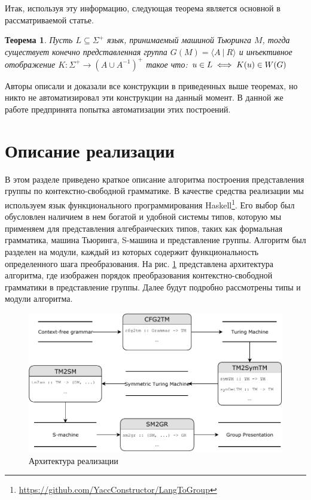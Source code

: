 \documentclass[14pt]{matmex-diploma-custom}
\newtheorem{thm}{Теорема}[subsection]
\begin{document}
Итак, используя эту информацию, следующая теорема является основной в рассматриваемой статье.

\begin{thm} \label{basethm}
Пусть $L \subseteq \Sigma^+$ язык, принимаемый машиной Тьюринга $M$,
    тогда существует конечно представленная группа $G(M)=\langle A~|~R \rangle$
    и инъективное отображение $K: \Sigma^+ \to (A \cup A^{-1})^+$ такое что:
    $\\u \in L \iff K(u)\in W(G)$
\end{thm}

Авторы описали и доказали все конструкции в приведенных выше теоремах,
но никто не автоматизировал эти конструкции на данный момент. В данной же работе предпринята попытка автоматизации этих построений. 

\section{Описание реализации}

В этом разделе приведено краткое описание алгоритма построения представления
группы по контекстно-свободной грамматике. 
В качестве средства реализации мы используем язык функционального 
программирования Haskell\footnote{\url{https://github.com/YaccConstructor/LangToGroup}}.
Его выбор был обусловлен наличием в нем богатой и удобной системы типов,
которую мы применяем для представления алгебраических типов, таких как формальная грамматика,
машина Тьюринга, S-машина и представление группы. 
Алгоритм был разделен на модули, каждый из которых
содержит функциональность определенного шага преобразования. 
На рис. \ref{fig:arch} представлена архитектура алгоритма,
где изображен порядок преобразования контекстно-свободной грамматики 
в представление группы. Далее будут подробно рассмотрены типы и модули алгоритма.

\begin{figure}[H]
\centering
  \includegraphics[width=\linewidth]{pics/diplomaSmallUML.pdf}
  \caption{Архитектура реализации}
  \label{fig:arch}
\end{figure}
\end{document}
